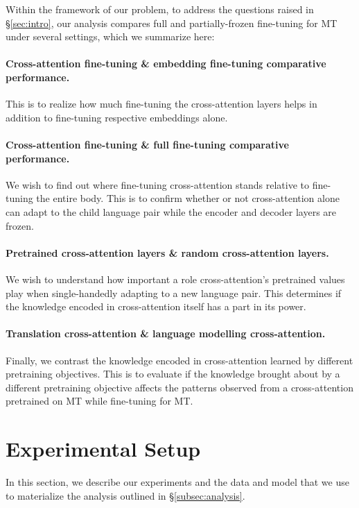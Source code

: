Within the framework of our problem, to address the questions raised in \S\ref{sec:intro}, our analysis compares full and partially-frozen fine-tuning for MT under several settings, which we summarize here:

\paragraph{Cross-attention fine-tuning \& embedding fine-tuning comparative performance.} \label{a:s1} This is to realize how much fine-tuning the cross-attention layers helps in addition to fine-tuning respective embeddings alone.

\paragraph{Cross-attention fine-tuning \& full fine-tuning comparative performance.} \label{a:s2} We wish to find out where fine-tuning  cross-attention stands relative to fine-tuning the entire body. This is to confirm whether or not cross-attention alone can adapt to the child language pair while the encoder and decoder layers are frozen.

\paragraph{Pretrained cross-attention layers \& random cross-attention layers.} \label{a:s3} We wish to understand how important a role cross-attention's pretrained values play when single-handedly adapting to a new language pair. This determines if the knowledge encoded in cross-attention itself has a part in its power.

\paragraph{Translation cross-attention \& language modelling cross-attention.} \label{a:s4} Finally, we contrast the knowledge encoded in cross-attention learned by different pretraining objectives. This is to evaluate if the knowledge brought about by a different pretraining objective affects the patterns observed from a cross-attention pretrained on MT while fine-tuning for MT.

\section{Experimental Setup}

In this section, we describe our experiments and the data and model that we use to materialize the analysis outlined in \S\ref{subsec:analysis}.


